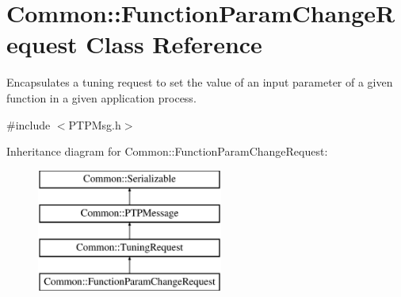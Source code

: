 \hypertarget{class_common_1_1_function_param_change_request}{\section{Common\-:\-:Function\-Param\-Change\-Request Class Reference}
\label{class_common_1_1_function_param_change_request}
}


Encapsulates a tuning request to set the value of an input parameter of a given function in a given application process.  




{\ttfamily \#include $<$P\-T\-P\-Msg.\-h$>$}

Inheritance diagram for Common\-:\-:Function\-Param\-Change\-Request\-:\begin{figure}[H]
\begin{center}
\leavevmode
\includegraphics[height=4.000000cm]{class_common_1_1_function_param_change_request}
\end{center}
\end{figure}
